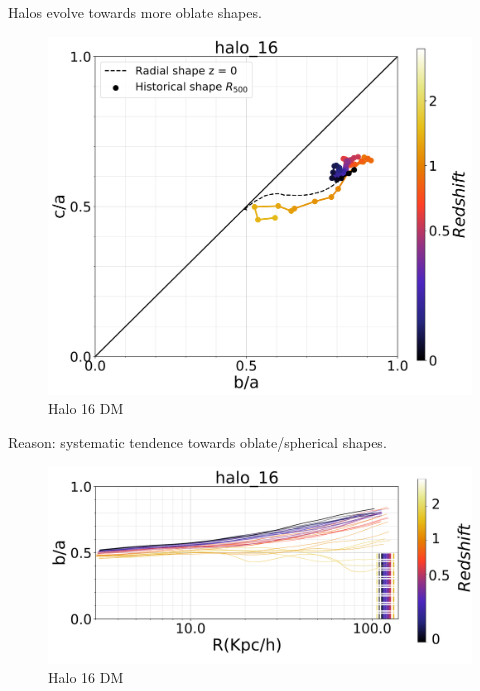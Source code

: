 \documentclass[xcolor=dvipsnames]{beamer}
\begin{document}
\begin{frame}
\centering
Halos evolve towards more oblate shapes.
\begin{figure}[!ht]
  \centering
 \includegraphics[width=0.7\columnwidth]{../Document/pics/Redshift/halo_16_level3_DM_Z_Triax.png}
 \caption{Halo 16 DM}
  
  \label{fig:RedshiftDM}
\end{figure}

\end{frame}


\begin{frame}
\centering
Reason: systematic tendence towards oblate/spherical shapes.
\begin{figure}[!ht]
  \centering
  \includegraphics[width=1\columnwidth]{./pics/halo_16_level3_DM_Z.png}
  \caption{Halo 16 DM}
  \hfill

\end{figure}
\end{frame}
\end{document}
